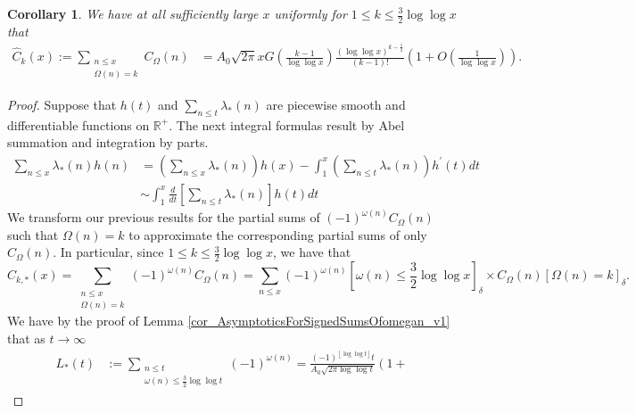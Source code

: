 \documentclass[11pt,reqno,a4letter]{article}
\numberwithin{figure}{section}
\numberwithin{table}{section}
\newcommand{\Iverson}[1]{\ensuremath{\left[#1\right]_{\delta}}}
\newcommand{\floor}[1]{\left\lfloor #1 \right\rfloor}
\theoremstyle{plain}
\newtheorem{cor}[theorem]{Corollary}
\numberwithin{theorem}{section}
\theoremstyle{definition}
\begin{document}
\begin{cor} 
\label{cor_SummatoryFuncsOfUnsignedSeqs_v2} 
We have at all sufficiently large $x$ uniformly for 
$1 \leq k \leq \frac{3}{2} \log\log x$ that 
\begin{align*} 
\widehat{C}_k(x) := 
     \sum_{\substack{n \leq x \\ \Omega(n) = k}} C_{\Omega}(n) & 
     = A_0 \sqrt{2\pi} x 
     \widehat{G}\left(\frac{k-1}{\log\log x}\right) 
     \frac{(\log\log x)^{k-\frac{1}{2}}}{(k-1)!} \left( 
     1 + O\left(\frac{1}{\log\log x}\right)\right). 
\end{align*} 
\end{cor} 
\begin{proof} 
Suppose that $h(t)$ and $\sum_{n \leq t} \lambda_{\ast}(n)$ are 
piecewise smooth and differentiable functions on $\mathbb{R}^{+}$. 
The next integral formulas result by 
Abel summation and integration by parts. 
\begin{subequations}
\begin{align} 
\label{eqn_AbelSummationIBPReverseFormula_stmt_v1} 
     \sum_{n \leq x} \lambda_{\ast}(n) h(n) & = \left(\sum_{n \leq x} \lambda_{\ast}(n)\right) h(x) - 
     \int_{1}^{x} \left(\sum_{n \leq t} \lambda_{\ast}(n)\right) h^{\prime}(t) dt \\ 
\label{eqn_AbelSummationIBPReverseFormula_stmt_v2}
     & \sim 
     \int_1^{x} \frac{d}{dt}\left[\sum_{n \leq t} \lambda_{\ast}(n)\right] h(t) dt
\end{align} 
\end{subequations}
We transform our previous results for the partial sums of 
$(-1)^{\omega(n)} C_{\Omega}(n)$ such that $\Omega(n) = k$ to approximate 
the corresponding partial sums of only $C_{\Omega}(n)$. 
In particular, since $1 \leq k \leq \frac{3}{2} \log\log x$, we have that 
\[
\widehat{C}_{k,\ast}(x) = 
     \sum_{\substack{n \leq x \\ \Omega(n)=k}} (-1)^{\omega(n)} C_{\Omega}(n) = 
     \sum_{n \leq x} (-1)^{\omega(n)} \Iverson{\omega(n) \leq \frac{3}{2} \log\log x} \times 
     C_{\Omega}(n) \Iverson{\Omega(n) = k}. 
\]
We have by the proof of Lemma \ref{cor_AsymptoticsForSignedSumsOfomegan_v1} 
that as $t \rightarrow \infty$ 
\begin{align} 
\label{eqn_ProofTag_LAsttSummatoryFuncAsymptotics_v1}
L_{\ast}(t) & := \sum_{\substack{n \leq t \\ \omega(n) \leq \frac{3}{2} \log\log t}} 
     (-1)^{\omega(n)} 
     = \frac{(-1)^{\floor{\log\log t}} t}{A_0 \sqrt{2\pi \log\log t}}\left(1 + 

\end{align}
\end{proof}
\end{document}
